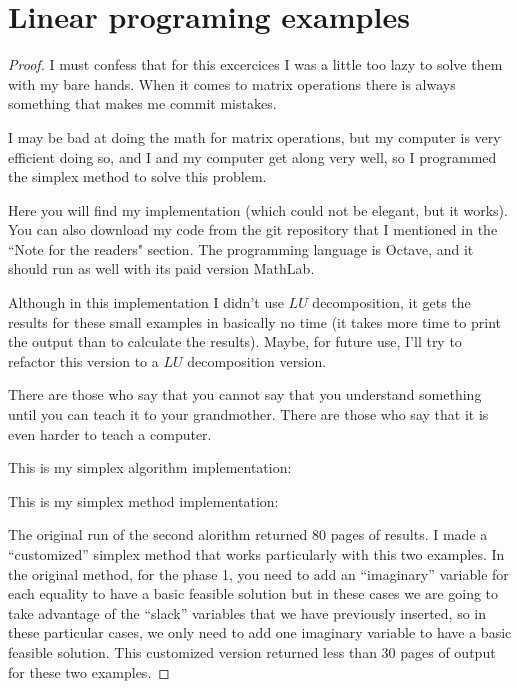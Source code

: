 ﻿\chapter{Linear programing examples}


\begin{proof}
    I must confess that for this excercices I was a little too lazy to solve them with my bare hands.
    When it comes to matrix operations there is always something that makes me commit mistakes.\pn
    
    I may be bad at doing the math for matrix operations, but my computer is very efficient doing so,
    and I and my computer get along  very well, so I programmed the simplex method to solve this problem.\pn
    
    Here you will find my implementation (which could not be elegant, but it works). You can also download my code from
    the git repository that I mentioned in the ``Note for the readers" section. The programming language is Octave, and it should
    run as well with its paid version MathLab.\pn
    
    Although in this implementation I didn't use $LU$ decomposition, it gets the results for these small examples in
    basically no time (it takes more time to print the output than to calculate the results). Maybe, for future use,
    I'll try to refactor this version to a $LU$ decomposition version.\pn
    
    There are those who say that you cannot say that you understand something until you can teach it to your grandmother.
    There are those who say that it is even harder to teach a computer.\pn
        
    \newpage
    This is my simplex algorithm implementation:
    \small
    
    \normalsize
    
    \newpage
    This is my simplex method implementation:
    \small
    
    \normalsize
    
    The original run of the second alorithm returned $80$ pages of results. I made a ``customized'' simplex method that works particularly
    with this two examples. In the original method, for the phase 1, you need to add an ``imaginary'' variable for each equality to have a 
    basic feasible solution but in these cases we are going to take advantage of the ``slack'' variables that we have previously inserted, so
    in these particular cases, we only need to add one imaginary variable to have a basic feasible solution. This customized version returned
    less than 30 pages of output for these two examples.\pn
        

\end{proof}
